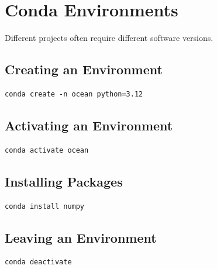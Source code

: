\section{Conda Environments}

Different projects often require different software versions.

\subsection{Creating an Environment}

\begin{lstlisting}
conda create -n ocean python=3.12
\end{lstlisting}

\subsection{Activating an Environment}

\begin{lstlisting}
conda activate ocean
\end{lstlisting}

\subsection{Installing Packages}

\begin{lstlisting}
conda install numpy
\end{lstlisting}

\subsection{Leaving an Environment}

\begin{lstlisting}
conda deactivate
\end{lstlisting}
